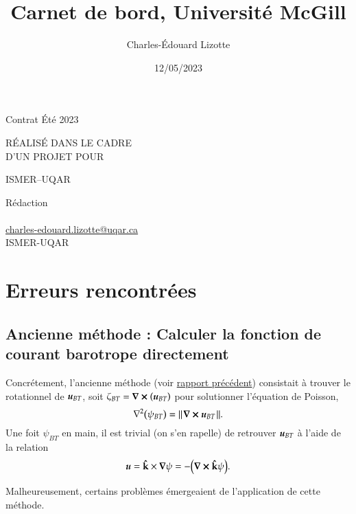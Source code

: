 \documentclass[10pt]{article}
\author{Charles-Édouard Lizotte}
\date{12/05/2023}
\title{Carnet de bord, Université McGill}
\makeatletter
\numberwithin{equation}{section}
\newcommand{\kvf}{\vb{\hat{k}}}
\newcommand{\uu}{\vb*{u}}
\newcommand{\pt}{\hspace{1pt}}
\newcommand{\mytitlepage}{
\begin{titlepage}
\begin{center}
{\Large Contrat Été 2023 \par}
\vspace{2cm}
{\Large \MakeUppercase{\thetitle} \par}
\vspace{2cm}
RÉALISÉ DANS LE CADRE\\ D'UN PROJET POUR \par
\vspace{2cm}
{\Large ISMER--UQAR \par}
\vspace{2cm}
{\thedate}
\end{center}
\vfill
Rédaction \\
{\theauthor}\\
\url{charles-edouard.lizotte@uqar.ca}\\
ISMER-UQAR
\end{titlepage}
}
\makeatother
\begin{document}
\mytitlepage
\tableofcontents\newpage

\section{Erreurs rencontrées}
\label{sec:org649aadd}

\subsection{Ancienne méthode : Calculer la fonction de courant barotrope directement}
\label{sec:orge89aaa3}
Concrétement, l'ancienne méthode (voir \href{rapport-2023-04-28.org}{rapport précédent}) consistait à trouver le rotationnel de \(\uu_{BT}\), soit \(\zeta_{BT} = \curl(\uu_{BT})\) pour solutionner l'équation de Poisson,
\begin{equation}
\label{eq:orgf6c2c59}
   \laplacian(\psi_{BT}) =  \norm{\pt\curl{\uu_{BT}}\pt}.
\end{equation}
Une foit \(\psi_{BT}\) en main, il est trivial (on s'en rapelle) de retrouver \(\uu_{BT}\) à l'aide de la relation
\begin{equation}
   \uu = \kvf\times\gradient{\psi} = - \qty(\curl{\kvf\psi}).
\end{equation}

Malheureusement, certains problèmes émergeaient de l'application de cette méthode.
\end{document}
